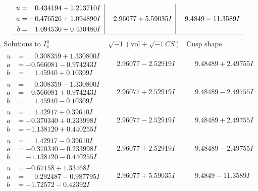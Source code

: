 \documentclass[1p]{elsarticle_modified}
\theoremstyle{definition}
\newcommand{\I}{\sqrt{-1}}
\begin{document}
$$\begin{array}{c|c|c}
\begin{aligned}
u &= \phantom{-}0.434194 - 1.213710 I \\
a &= -0.476526 + 1.094890 I \\
b &= \phantom{-}1.094530 + 0.430480 I\end{aligned}
 & \phantom{-}2.96077 + 5.59035 I & \phantom{-}9.4849 - 11.3589 I\\
 \hline 
 \end{array}$$\newpage$$\begin{array}{c|c|c}  
\text{Solutions to }I^u_{4}& \I (\text{vol} + \sqrt{-1}CS) & \text{Cusp shape}\\
 \hline 
\begin{aligned}
u &= \phantom{-}0.308359 + 1.330800 I \\
a &= -0.566081 - 0.974243 I \\
b &= \phantom{-}1.45940 + 0.10309 I\end{aligned}
 & \phantom{-}2.96077 - 2.52919 I & \phantom{-}9.48489 + 2.49755 I \\ \hline\begin{aligned}
u &= \phantom{-}0.308359 - 1.330800 I \\
a &= -0.566081 + 0.974243 I \\
b &= \phantom{-}1.45940 - 0.10309 I\end{aligned}
 & \phantom{-}2.96077 + 2.52919 I & \phantom{-}9.48489 - 2.49755 I \\ \hline\begin{aligned}
u &= \phantom{-}1.42917 + 0.39610 I \\
a &= -0.370340 + 0.233998 I \\
b &= -1.138120 + 0.440255 I\end{aligned}
 & \phantom{-}2.96077 - 2.52919 I & \phantom{-}9.48489 + 2.49755 I \\ \hline\begin{aligned}
u &= \phantom{-}1.42917 - 0.39610 I \\
a &= -0.370340 - 0.233998 I \\
b &= -1.138120 - 0.440255 I\end{aligned}
 & \phantom{-}2.96077 + 2.52919 I & \phantom{-}9.48489 - 2.49755 I \\ \hline\begin{aligned}
u &= -0.67158 + 1.33468 I \\
a &= \phantom{-}0.292487 - 0.987795 I \\
b &= -1.72572 - 0.42392 I\end{aligned}
 & \phantom{-}2.96077 + 5.59035 I & \phantom{-}9.4849 - 11.3589 I \\ \hline\begin{aligned}

\end{aligned}
\end{array}$$
\end{document}
